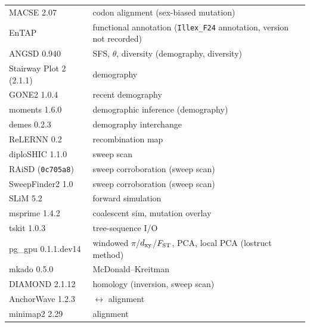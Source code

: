 \begin{table}[t]
\begin{tabularx}{\linewidth}{@{}l>{\raggedright\arraybackslash}Xl@{}}
    MACSE 2.07               & codon alignment (sex-biased mutation)         & \citep{ranwez2018macse} \\
    EnTAP                    & functional annotation (\texttt{Illex\_F24} annotation, version not recorded) & \citep{hart2020entap} \\
    ANGSD 0.940              & SFS, $\theta$, diversity (demography, diversity) & \citep{korneliussen2014angsd} \\
    Stairway Plot 2 (2.1.1)  & demography                 & \citep{liu2020stairway} \\
    GONE2 1.0.4              & recent demography          & \citep{gone2} \\
    moments 1.6.0            & demographic inference (demography)      & \citep{jouganous2017moments} \\
    demes 0.2.3              & demography interchange                         & \citep{gower2022demes} \\
    ReLERNN 0.2              & recombination map         & \citep{adrion2020relernn} \\
    diploSHIC 1.1.0          & sweep scan                 & \citep{kern2018diploshic} \\
    RAiSD (\texttt{0c705a8}) & sweep corroboration (sweep scan)        & \citep{alachiotis2018raisd} \\
    SweepFinder2 1.0         & sweep corroboration (sweep scan)              & \citep{nielsen2005,degiorgio2016} \\
    SLiM 5.2                 & forward simulation                            & \citep{haller2019slim} \\
    msprime 1.4.2            & coalescent sim, mutation overlay              & \citep{baumdicker2022} \\
    tskit 1.0.3              & tree-sequence I/O                             & \citep{kelleher2018} \\
    pg\_gpu 0.1.1.dev14      & windowed $\pi$/$d_\mathrm{xy}$/$F_\mathrm{ST}$, PCA, local PCA (lostruct method) & \citep{pggpu,li2019lostruct} \\
    mkado 0.5.0              & McDonald--Kreitman            & \citep{mkado} \\
    DIAMOND 2.1.12           & homology (inversion, sweep scan)    & \citep{buchfink2021diamond} \\
    AnchorWave 1.2.3         & \coin{}$\leftrightarrow$\illex{} alignment    & \citep{song2022anchorwave} \\
    minimap2 2.29            & alignment                                     & \citep{li2018minimap2} \\

\end{tabularx}
\end{table}

